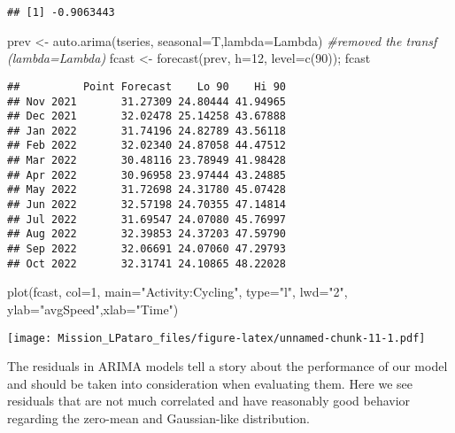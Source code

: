 \documentclass[
]{article}
\newenvironment{Shaded}{\begin{snugshade}}{\end{snugshade}}
\newcommand{\AttributeTok}[1]{\textcolor[rgb]{0.77,0.63,0.00}{#1}}
\newcommand{\CommentTok}[1]{\textcolor[rgb]{0.56,0.35,0.01}{\textit{#1}}}
\newcommand{\DecValTok}[1]{\textcolor[rgb]{0.00,0.00,0.81}{#1}}
\newcommand{\FunctionTok}[1]{\textcolor[rgb]{0.00,0.00,0.00}{#1}}
\newcommand{\NormalTok}[1]{#1}
\newcommand{\OtherTok}[1]{\textcolor[rgb]{0.56,0.35,0.01}{#1}}
\newcommand{\StringTok}[1]{\textcolor[rgb]{0.31,0.60,0.02}{#1}}
\begin{document}
\begin{verbatim}
## [1] -0.9063443
\end{verbatim}

\begin{Shaded}
\begin{Highlighting}[]
\NormalTok{prev }\OtherTok{\textless{}{-}} \FunctionTok{auto.arima}\NormalTok{(tseries, }\AttributeTok{seasonal=}\NormalTok{T,}\AttributeTok{lambda=}\NormalTok{Lambda) }\CommentTok{\#removed the transf (lambda=Lambda)}
\NormalTok{fcast }\OtherTok{\textless{}{-}} \FunctionTok{forecast}\NormalTok{(prev, }\AttributeTok{h=}\DecValTok{12}\NormalTok{, }\AttributeTok{level=}\FunctionTok{c}\NormalTok{(}\DecValTok{90}\NormalTok{)); fcast}
\end{Highlighting}
\end{Shaded}

\begin{verbatim}
##          Point Forecast    Lo 90    Hi 90
## Nov 2021       31.27309 24.80444 41.94965
## Dec 2021       32.02478 25.14258 43.67888
## Jan 2022       31.74196 24.82789 43.56118
## Feb 2022       32.02340 24.87058 44.47512
## Mar 2022       30.48116 23.78949 41.98428
## Apr 2022       30.96958 23.97444 43.24885
## May 2022       31.72698 24.31780 45.07428
## Jun 2022       32.57198 24.70355 47.14814
## Jul 2022       31.69547 24.07080 45.76997
## Aug 2022       32.39853 24.37203 47.59790
## Sep 2022       32.06691 24.07060 47.29793
## Oct 2022       32.31741 24.10865 48.22028
\end{verbatim}

\begin{Shaded}
\begin{Highlighting}[]
\FunctionTok{plot}\NormalTok{(fcast, }\AttributeTok{col=}\DecValTok{1}\NormalTok{, }\AttributeTok{main=}\StringTok{"Activity:Cycling"}\NormalTok{, }\AttributeTok{type=}\StringTok{"l"}\NormalTok{, }\AttributeTok{lwd=}\StringTok{"2"}\NormalTok{, }\AttributeTok{ylab=}\StringTok{"avgSpeed"}\NormalTok{,}\AttributeTok{xlab=}\StringTok{"Time"}\NormalTok{)}
\end{Highlighting}
\end{Shaded}

\texttt{[image: Mission\_LPataro\_files/figure-latex/unnamed-chunk-11-1.pdf]}

The residuals in ARIMA models tell a story about the performance of our
model and should be taken into consideration when evaluating them. Here
we see residuals that are not much correlated and have reasonably good
behavior regarding the zero-mean and Gaussian-like distribution.
\end{document}
